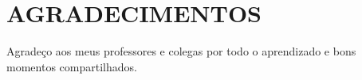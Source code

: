 \section*{AGRADECIMENTOS}

Agradeço aos meus professores e colegas por todo o aprendizado e bons momentos compartilhados.

\pagebreak
